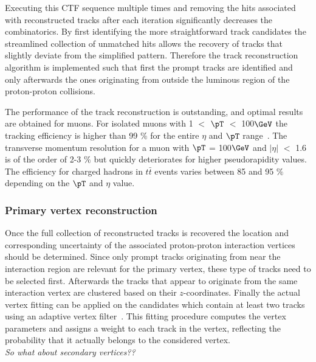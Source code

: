 Executing this CTF sequence multiple times and removing the hits associated with reconstructed tracks after each iteration significantly decreases the combinatorics. %
By first identifying the more straightforward track candidates the streamlined collection of unmatched hits allows the recovery of tracks that slightly deviate from the simplified pattern. 
Therefore the track reconstruction algorithm is implemented such that first the prompt tracks are identified and only afterwards the ones originating from outside the luminous region of the proton-proton collisions.

The performance of the track reconstruction is outstanding, and optimal results are obtained for muons. For isolated muons with 1 $<$ $\pT$ $<$ 100$\GeV$ the tracking efficiency is higher than 99 $\%$ for the entire $\eta$ and $\pT$ range~\cite{TrackAndPVReco}. The transverse momentum resolution for a muon with $\pT$ = 100$\GeV$ and $\vert \eta \vert$ $<$ 1.6 is of the order of 2-3 $\%$ but quickly deteriorates for higher pseudorapidity values.
The efficiency for charged hadrons in $t\bar{t}$ events varies between 85 and 95 $\%$ depending on the $\pT$ and $\eta$ value. %

\subsubsection*{Primary vertex reconstruction}
Once the full collection of reconstructed tracks is recovered the location and corresponding uncertainty of the associated proton-proton interaction vertices should be determined. Since only prompt tracks originating from near the interaction region are relevant for the primary vertex, these type of tracks need to be selected first. Afterwards the tracks that appear to originate from the same interaction vertex are clustered based on their $z$-coordinates. Finally the actual vertex fitting can be applied on the candidates which contain at least two tracks using an adaptive vertex filter~\cite{AdaptiveVertexFitting}. This fitting procedure computes the vertex parameters and assigns a weight to each track in the vertex, reflecting the probability that it actually belongs to the considered vertex.\\
\textit{So what about secondary vertices??}

